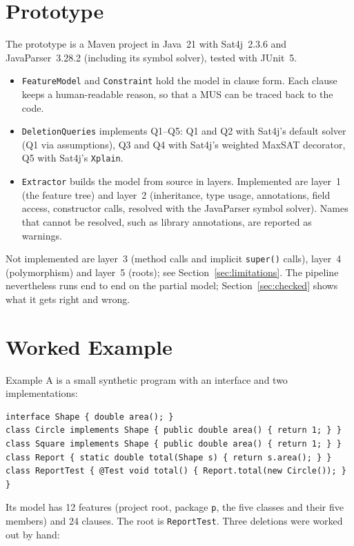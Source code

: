 \documentclass[11pt,a4paper]{article}
\newcommand{\code}[1]{\texttt{#1}}
\begin{document}
\section{Prototype}

The prototype is a Maven project in Java~21 with Sat4j~2.3.6 and
JavaParser~3.28.2 (including its symbol solver), tested with JUnit~5.

\begin{itemize}
  \item \code{FeatureModel} and \code{Constraint} hold the model in clause
        form. Each clause keeps a human-readable reason, so that a MUS can be
        traced back to the code.
  \item \code{DeletionQueries} implements Q1--Q5: Q1 and Q2 with Sat4j's
        default solver (Q1 via assumptions), Q3 and Q4 with Sat4j's weighted
        MaxSAT decorator, Q5 with Sat4j's \code{Xplain}.
  \item \code{Extractor} builds the model from source in layers. Implemented
        are layer~1 (the feature tree) and layer~2 (inheritance, type usage,
        annotations, field access, constructor calls, resolved with the
        JavaParser symbol solver). Names that cannot be resolved, such as
        library annotations, are reported as warnings.
\end{itemize}

Not implemented are layer~3 (method calls and implicit \code{super()}
calls), layer~4 (polymorphism) and layer~5 (roots); see
Section~\ref{sec:limitations}. The pipeline nevertheless runs end to end
on the partial model; Section~\ref{sec:checked} shows what it gets right
and wrong.

\section{Worked Example}

Example A is a small synthetic program with an interface and two
implementations:

\begin{lstlisting}
interface Shape { double area(); }
class Circle implements Shape { public double area() { return 1; } }
class Square implements Shape { public double area() { return 1; } }
class Report { static double total(Shape s) { return s.area(); } }
class ReportTest { @Test void total() { Report.total(new Circle()); } }
\end{lstlisting}

Its model has 12 features (project root, package \code{p}, the five classes
and their five members) and 24 clauses. The root is \code{ReportTest}.
Three deletions were worked out by hand:
\end{document}
